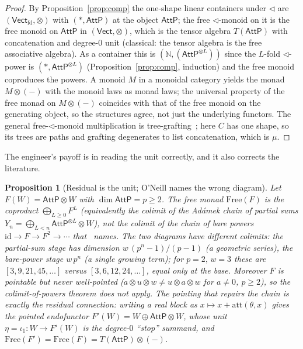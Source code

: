 \documentclass[11pt]{article}
\newcommand{\Vect}{\mathsf{Vect}}
\newcommand{\id}{\mathrm{id}}
\newcommand{\AttP}{\mathsf{AttP}}
\theoremstyle{plain}
\newtheorem{proposition}[theorem]{Proposition}
\theoremstyle{definition}
\begin{document}
\begin{proof}
By Proposition~\ref{prop:comp} the one-shape linear containers under $\lhd$ are $(\Vect_{\mathrm{fd}},\otimes)$
with $(\ast,\AttP)$ at the object $\AttP$; the free $\lhd$-monoid on it is the free monoid on $\AttP$ in
$(\Vect,\otimes)$, which is the tensor algebra $T(\AttP)$ with concatenation and degree-$0$ unit
(classical: the tensor algebra is the free associative algebra). As a container this is
$(\mathbb{N},(\AttP^{\otimes L}))$ since the $L$-fold $\lhd$-power is $(\ast,\AttP^{\otimes L})$
(Proposition~\ref{prop:comp}, induction) and the free monoid coproduces the powers. A monoid $M$ in a
monoidal category yields the monad $M\otimes(-)$ with the monoid laws as monad laws; the universal property
of the free monad on $M\otimes(-)$ coincides with that of the free monoid on the generating object, so the
structures agree, not just the underlying functors. The general free-$\lhd$-monoid multiplication is
tree-grafting~\cite{djn}; here $C$ has one shape, so its trees are paths and grafting degenerates to list
concatenation, which is $\mu$.
\end{proof}

The engineer's payoff is in reading the unit correctly, and it also corrects the literature.

\begin{proposition}[Residual is the unit; O'Neill names the wrong diagram]\label{prop:residual}
Let $F(W)=\AttP\otimes W$ with $\dim\AttP=p\ge 2$. The free monad $\mathrm{Free}(F)$ is the coproduct
$\bigoplus_{L\ge 0}F^{L}$ (equivalently the colimit of the Adámek chain of partial sums
$Y_{n}=\bigoplus_{L<n}\AttP^{\otimes L}\otimes W$), \emph{not} the colimit of the chain of bare powers
$\id\to F\to F^{2}\to\cdots$ that~\cite[Thm.~3.2]{oneill} names. The two diagrams have different colimits:
the partial-sum stage has dimension $w\,(p^{n}-1)/(p-1)$ (a geometric \emph{series}), the bare-power stage
$w\,p^{n}$ (a single growing \emph{term}); for $p=2,\,w=3$ these are $[3,9,21,45,\dots]$ versus
$[3,6,12,24,\dots]$, equal only at the base. Moreover $F$ is pointable but never well-pointed
($a\otimes u\otimes w\ne u\otimes a\otimes w$ for $a\ne 0$, $p\ge 2$), so the colimit-of-powers theorem does
not apply. The pointing that repairs the chain is exactly the residual connection: writing a real block as
$x\mapsto x+\mathrm{att}(\theta,x)$ gives the pointed endofunctor $F'(W)=W\oplus\AttP\otimes W$, whose unit
$\eta=\iota_{1}:W\to F'(W)$ is the degree-$0$ ``stop'' summand, and $\mathrm{Free}(F')=\mathrm{Free}(F)=T(\AttP)\otimes(-)$.
\end{proposition}
\end{document}
